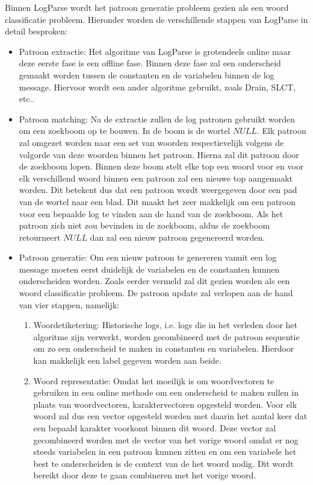 Binnen LogParse wordt het patroon generatie probleem gezien als een woord classificatie probleem. Hieronder worden de verschillende stappen van LogParse in detail besproken:
\begin{itemize}
    \item Patroon extractie: Het algoritme van LogParse is grotendeels online maar deze eerste fase is een offline fase. Binnen deze fase zal een onderscheid gemaakt worden tussen de constanten en de variabelen binnen de log message. Hiervoor wordt een ander algoritme gebruikt, zoals Drain, SLCT, etc..\\
     
    \item Patroon matching: Na de extractie zullen de log patronen gebruikt worden om een zoekboom op te bouwen. In de boom is de wortel $NULL$. Elk patroon zal omgezet worden naar een set van woorden respectievelijk volgens de volgorde van deze woorden binnen het patroon. Hierna zal dit patroon door de zoekboom lopen. Binnen deze boom stelt elke top een woord voor en voor elk verschillend woord binnen een patroon zal een nieuwe top aangemaakt worden. Dit betekent dus dat een patroon wordt weergegeven door een pad van de wortel naar een blad. Dit maakt het zeer makkelijk om een patroon voor een bepaalde log te vinden aan de hand van de zoekboom. Als het patroon zich niet zou bevinden in de zoekboom, aldus de zoekboom retourneert $NULL$ dan zal een nieuw patroon gegenereerd worden.\\
    
    \item Patroon generatie: Om een nieuw patroon te genereren vanuit een log message moeten eerst duidelijk de variabelen en de constanten kunnen onderscheiden worden. Zoals eerder vermeld zal dit gezien worden als een woord classificatie probleem. De patroon update zal verlopen aan de hand van vier stappen, namelijk:
    \begin{enumerate}
        \item Woordetiketering: Historische logs, i.e. logs die in het verleden door het algoritme zijn verwerkt, worden gecombineerd met de patroon sequentie om zo een onderscheid te maken in constanten en variabelen. Hierdoor kan makkelijk een label gegeven worden aan beide.\\
        
        \item Woord representatie: Omdat het moeilijk is om woordvectoren te gebruiken in een online methode om een onderscheid te maken zullen in plaats van woordvectoren, karaktervectoren opgesteld worden. Voor elk woord zal dus een vector opgesteld worden met daarin het aantal keer dat een bepaald karakter voorkomt binnen dit woord. Deze vector zal gecombineerd worden met de vector van het vorige woord omdat er nog steeds variabelen in een patroon kunnen zitten en om een variabele het best te onderscheiden is de context van de het woord nodig. Dit wordt bereikt door deze te gaan combineren met het vorige woord.\\
        

\end{enumerate}
\end{itemize}

